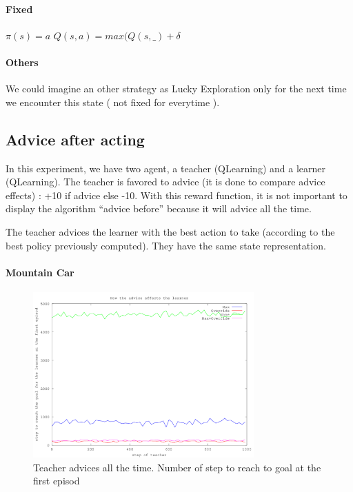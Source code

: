 \documentclass[a4paper,12pt]{article}
\begin{document}
       
       
       \paragraph{Fixed} 
	$\pi(s)=a$ \newline
	$Q(s,a) = max(Q(s,\_) + \delta$

	\paragraph{Others}
      We could imagine an other strategy as Lucky Exploration only for 
      the next time we encounter this state ( not fixed for everytime ).
      
      \subsection{Advice after acting}
      In this experiment, we have two agent, a teacher (QLearning) and a learner (QLearning).
      The teacher is favored to advice (it is done to compare advice effects) : +10 if advice
      else -10. With this reward function, it is not important to display the algorithm ``advice before''
      because it will advice all the time.
      
      The teacher advices the learner with the best action to take (according to 
      the best policy previously computed). They have the same state representation.
            
      \paragraph{Mountain Car}
      \begin{figure}[H]
      \begin{center}
	\includegraphics[width=320px]{graphA_MA}
	\caption{ Teacher advices all the time. Number of step to reach to goal at the first episod }
	\end{center}
      \end{figure}
      
\end{document}
